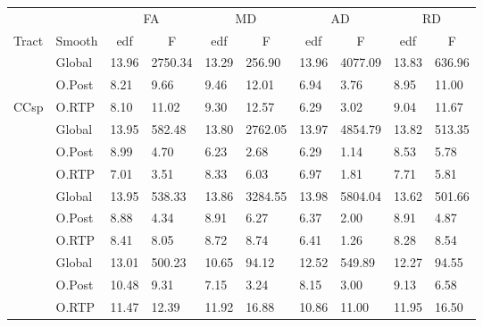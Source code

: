 
\begin{tabular}{llll|ll|ll|ll}
 &  & \multicolumn{2}{c|}{FA} & \multicolumn{2}{c|}{MD} & \multicolumn{2}{c|}{AD} & \multicolumn{2}{c}{RD} \\ \cline{3-10}
Tract & Smooth & \multicolumn{1}{c}{edf} & \multicolumn{1}{c|}{F} & \multicolumn{1}{c}{edf} & \multicolumn{1}{c|}{F} & \multicolumn{1}{c}{edf} & \multicolumn{1}{c|}{F} & \multicolumn{1}{c}{edf} & \multicolumn{1}{c}{F} \\ \hline
 & \multicolumn{1}{l|}{Global} & 13.96 & 2750.34 & 13.29 & 256.90 & 13.96 & 4077.09 & 13.83 & 636.96 \\
 & \multicolumn{1}{l|}{\cellcolor[HTML]{C0C0C0}O.Post} & \cellcolor[HTML]{C0C0C0}8.21 & \cellcolor[HTML]{C0C0C0}9.66 & \cellcolor[HTML]{C0C0C0}9.46 & \cellcolor[HTML]{C0C0C0}12.01 & \cellcolor[HTML]{C0C0C0}6.94 & \cellcolor[HTML]{C0C0C0}3.76 & \cellcolor[HTML]{C0C0C0}8.95 & \cellcolor[HTML]{C0C0C0}11.00 \\
\multirow{-3}{*}{CCsp} & \multicolumn{1}{l|}{O.RTP} & 8.10 & 11.02 & 9.30 & 12.57 & 6.29 & 3.02 & 9.04 & 11.67 \\
\rowcolor[HTML]{EFEFEF}
\cellcolor[HTML]{EFEFEF} & \multicolumn{1}{l|}{\cellcolor[HTML]{EFEFEF}Global} & 13.95 & 582.48 & 13.80 & 2762.05 & 13.97 & 4854.79 & 13.82 & 513.35 \\
\rowcolor[HTML]{C0C0C0}
\cellcolor[HTML]{EFEFEF} & \multicolumn{1}{l|}{\cellcolor[HTML]{C0C0C0}O.Post} & 8.99 & 4.70 & 6.23 & 2.68 & 6.29 & 1.14 & 8.53 & 5.78 \\
\rowcolor[HTML]{EFEFEF}
\multirow{-3}{*}{\cellcolor[HTML]{EFEFEF}CCsf} & \multicolumn{1}{l|}{\cellcolor[HTML]{EFEFEF}O.RTP} & 7.01 & 3.51 & 8.33 & 6.03 & 6.97 & 1.81 & 7.71 & 5.81 \\
\rowcolor[HTML]{FFFFFF}
\cellcolor[HTML]{FFFFFF} & \multicolumn{1}{l|}{\cellcolor[HTML]{FFFFFF}Global} & 13.95 & 538.33 & 13.86 & 3284.55 & 13.98 & 5804.04 & 13.62 & 501.66 \\
\rowcolor[HTML]{C0C0C0}
\cellcolor[HTML]{FFFFFF} & \multicolumn{1}{l|}{\cellcolor[HTML]{C0C0C0}O.Post} & 8.88 & 4.34 & 8.91 & 6.27 & 6.37 & 2.00 & 8.91 & 4.87 \\
\rowcolor[HTML]{FFFFFF}
\multirow{-3}{*}{\cellcolor[HTML]{FFFFFF}CCmot} & \multicolumn{1}{l|}{\cellcolor[HTML]{FFFFFF}O.RTP} & 8.41 & 8.05 & 8.72 & 8.74 & 6.41 & 1.26 & 8.28 & 8.54 \\
\rowcolor[HTML]{EFEFEF}
\cellcolor[HTML]{EFEFEF} & \multicolumn{1}{l|}{\cellcolor[HTML]{EFEFEF}Global} & 13.01 & 500.23 & 10.65 & 94.12 & 12.52 & 549.89 & 12.27 & 94.55 \\
\rowcolor[HTML]{C0C0C0}
\cellcolor[HTML]{EFEFEF} & \multicolumn{1}{l|}{\cellcolor[HTML]{C0C0C0}O.Post} & 10.48 & 9.31 & 7.15 & 3.24 & 8.15 & 3.00 & 9.13 & 6.58 \\
\rowcolor[HTML]{EFEFEF}
\multirow{-3}{*}{\cellcolor[HTML]{EFEFEF}CCorb} & \multicolumn{1}{l|}{\cellcolor[HTML]{EFEFEF}O.RTP} & 11.47 & 12.39 & 11.92 & 16.88 & 10.86 & 11.00 & 11.95 & 16.50
\end{tabular}
